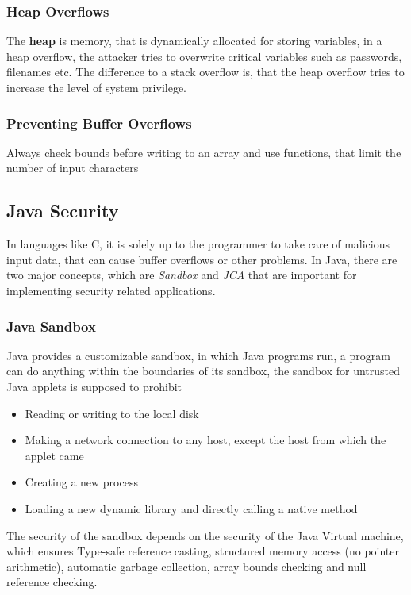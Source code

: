 \documentclass[a4paper, 10 pt, conference]{ieeeconf}
\begin{document}
\subsubsection{\textbf{Heap Overflows}}
The \textbf{heap} is memory, that is dynamically allocated for storing variables, in a heap overflow, the attacker tries to overwrite critical variables such as passwords, filenames etc. 
The difference to a stack overflow is, that the heap overflow tries to increase the level of system privilege. 
\vspace{0.5cm}
\subsubsection{\textbf{Preventing Buffer Overflows}}
Always check bounds before writing to an array and use functions, that limit the number of input characters

\subsection{\textbf{Java Security}}
In languages like C, it is solely up to the programmer to take care of malicious input data, that can cause buffer overflows or other problems. In Java, there are two major concepts, which are \emph{Sandbox} and \emph{JCA} that are important for implementing security related applications. 
\vspace{0.5cm}
\subsubsection{\textbf{Java Sandbox}}
\label{javasand}
Java provides a customizable sandbox, in which Java programs run, a program can do anything within the boundaries of its sandbox, the sandbox for untrusted Java applets is supposed to prohibit
\begin{itemize}
\item Reading or writing to the local disk
\item Making a network connection to any host, except the host from which the applet came
\item Creating a new process
\item Loading a new dynamic library and directly calling a native method
\end{itemize}

The security of the sandbox depends on the security of the Java Virtual machine, which ensures Type-safe reference casting, structured memory access (no pointer arithmetic), automatic garbage collection, array bounds checking and null reference checking. 
\end{document}

